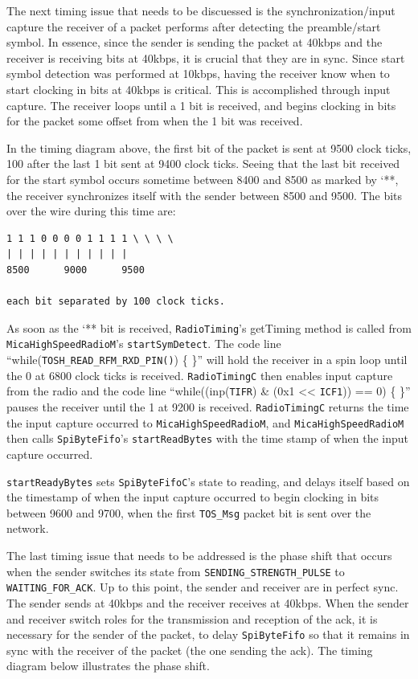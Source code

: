 \documentclass[11pt]{article}
\begin{document}
The next timing issue that needs to be discuessed is the
synchronization/input capture the receiver of a packet performs after
detecting the preamble/start symbol. In essence, since the sender is
sending the packet at 40kbps and the receiver is receiving bits at
40kbps, it is crucial that they are in sync. Since start symbol
detection was performed at 10kbps, having the receiver know when to
start clocking in bits at 40kbps is critical. This is accomplished
through input capture. The receiver loops until a 1 bit is received,
and begins clocking in bits for the packet some offset from when the 1
bit was received.

In the timing diagram above, the first bit of the packet is sent at
9500 clock ticks, 100 after the last 1 bit sent at 9400 clock ticks. Seeing
that the last bit received for the start symbol occurs sometime
between 8400 and 8500 as marked by `**, the receiver synchronizes
itself with the sender between 8500 and 9500.  The bits over the wire
during this time are:

\small
\begin{verbatim}
1 1 1 0 0 0 0 1 1 1 1 \ \ \ \
| | | | | | | | | | |
8500      9000      9500

each bit separated by 100 clock ticks.
\end{verbatim}
\normalsize

As soon as the `** bit is received, {\tt RadioTiming}'s getTiming method is
called from \\{\tt MicaHighSpeedRadioM}'s {\tt startSymDetect}. The code line
``while({\tt TOSH\_READ\_RFM\_RXD\_PIN()}) \{ \}'' will hold the receiver in a
spin loop until the 0 at 6800 clock ticks is received.  {\tt RadioTimingC}
then enables input capture from the radio and the code line
``while((inp({\tt TIFR}) \& (0x1 << {\tt ICF1})) == 0) \{ \}'' pauses the receiver
until the 1 at 9200 is received. {\tt RadioTimingC} returns
the time the input capture occurred to {\tt MicaHighSpeedRadioM}, and
{\tt MicaHighSpeedRadioM} then calls {\tt SpiByteFifo}'s {\tt startReadBytes} with the time stamp of
when the input capture occurred.

{\tt startReadyBytes} sets {\tt SpiByteFifoC}'s state to reading, and delays
itself based on the timestamp of when the input capture occurred to
begin clocking in bits between 9600 and 9700, when the first {\tt TOS\_Msg} packet bit
is sent over the network.

The last timing issue that needs to be addressed is the phase shift that
occurs when the sender switches its state from {\tt SENDING\_STRENGTH\_PULSE}
to {\tt WAITING\_FOR\_ACK}. Up to this point, the sender and receiver are in
perfect sync. The sender sends at 40kbps and the receiver receives at 40kbps. When the
sender and receiver switch roles for the transmission and reception of
the ack, it is necessary for the sender of the packet, to delay
{\tt SpiByteFifo} so that it remains in sync with the receiver of the packet
(the one sending the ack).  The timing diagram below illustrates the
phase shift.
\end{document}
